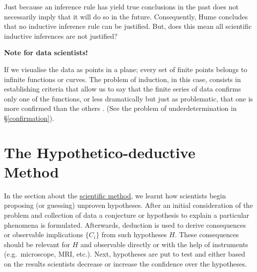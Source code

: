 \documentclass[
]{book}
\begin{document}
Just because an inference rule has yield true conclusions in the past does not necessarily imply that it will do so in the future.
Consequently, Hume concludes that no inductive inference rule can be justified. But, does this mean all scientific inductive inferences are not justified?

\begin{tipbox}

\textbf{Note for data scientists!}

If we visualise the data as points in a plane; every set of finite points belongs to infinite functions or curves. The problem of induction, in this case, consists in establishing criteria that allow us to say that the finite series of data confirms only one of the functions, or less dramatically but just as problematic, that one is more confirmed than the others \citep{diez1997fundamentos}. (See the problem of underdetermination in §\ref{confirmation}).

\end{tipbox}

\hypertarget{the-hypothetico-deductive-method}{%
\section{The Hypothetico-deductive Method}\label{the-hypothetico-deductive-method}}

In the section about the \protect\hyperlink{sci-method}{scientific method}, we learnt how scientists begin proposing (or guessing) unproven hypotheses. After an initial consideration of the problem and collection of data a conjecture or hypothesis to explain a particular phenomena is formulated. Afterwards, deduction is used to derive consequences or observable implications \(\{C_i\}\) from such hypotheses \(H\). These consequences should be relevant for \(H\) and observable directly or with the help of instruments (e.g.~microscope, MRI, etc.). Next, hypotheses are put to test and either based on the results scientists decrease or increase the confidence over the hypotheses.
\end{document}

